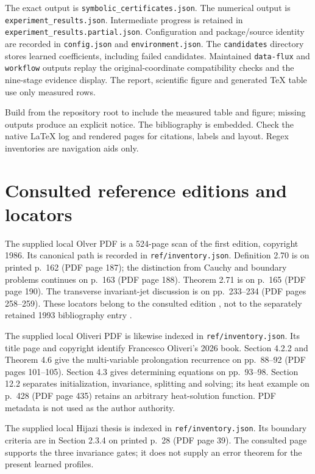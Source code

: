 \documentclass[12pt,a4paper,oneside]{report}
\numberwithin{equation}{chapter}
\DeclareRobustCommand{\code}[1]{\nolinkurl{#1}}
\begin{document}
The exact output is \code{symbolic_certificates.json}.
The numerical output is \code{experiment_results.json}.
Intermediate progress is retained in \code{experiment_results.partial.json}.
Configuration and package/source
identity are recorded in \code{config.json} and \code{environment.json}.
The \code{candidates} directory stores learned coefficients, including failed
candidates. Maintained \code{data-flux} and \code{workflow} outputs replay the
original-coordinate compatibility checks and the nine-stage evidence display.
The report, scientific figure and generated TeX table use only measured rows.

Build from the repository root to include the measured table and figure;
missing outputs produce an explicit notice. The bibliography is embedded.
Check the native LaTeX log and rendered pages for citations, labels and layout.
Regex inventories are navigation aids only.

\chapter{Consulted reference editions and locators}\label{app:references}
The supplied local Olver PDF is a 524-page scan of the first edition,
copyright 1986. Its canonical path is recorded in \code{ref/inventory.json}.
Definition 2.70 is
on printed p.~162 (PDF page 187); the distinction from Cauchy and boundary
problems continues on p.~163 (PDF page 188). Theorem 2.71 is on p.~165 (PDF
page 190). The transverse invariant-jet discussion is on pp.~233--234 (PDF
pages 258--259). These locators belong to the consulted edition
\cite{olver1986}, not to the separately retained 1993 bibliography entry
\cite{olver}.

The supplied local Oliveri PDF is likewise indexed in \code{ref/inventory.json}.
Its title page and copyright identify Francesco Oliveri's 2026 book.
Section 4.2.2 and Theorem 4.6 give the multi-variable prolongation recurrence
on pp.~88--92 (PDF pages 101--105). Section 4.3 gives determining equations
on pp.~93--98. Section 12.2 separates initialization, invariance, splitting
and solving; its heat example on p.~428 (PDF page 435) retains an arbitrary
heat-solution function. PDF metadata is not used as the author authority.

The supplied local Hijazi thesis is indexed in \code{ref/inventory.json}.
Its boundary criteria are in Section 2.3.4 on printed p.~28 (PDF page 39).
The consulted page supports the three invariance gates; it does not supply
an error theorem for the present learned profiles.
\end{document}
